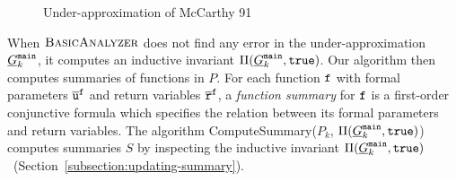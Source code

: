 \begin{figure}[htb]
{
	}  
  \caption{Under-approximation of McCarthy 91}
  \label{figure:under-mccarthy91}
\end{figure}

When $\textsc{BasicAnalyzer}$ does not find any error in the
under-approximation $\underline{G}^{\mathtt{{main}}}_k$, it computes an inductive
invariant $\Pi (\underline{G}^{\mathtt{{main}}}_k, \mathtt{true})$. Our algorithm then computes
summaries of functions in $P$. For each function $\mathtt{{f}}$ with
formal parameters $\overline{\mathtt{u}}^{\mathtt{{f}}}$ and return
variables $\overline{\mathtt{r}}^{\mathtt{{f}}}$, a \emph{function summary} for
$\mathtt{{f}}$ is a 
first-order conjunctive formula which specifies the relation between
its formal parameters and return variables. The algorithm
ComputeSummary($P_k$, $\Pi (\underline{G}^{\mathtt{{main}}}_k, \mathtt{true})$) computes summaries $S$ by inspecting
the inductive invariant $\Pi (\underline{G}^{\mathtt{{main}}}_k, \mathtt{true})$~(Section~\ref{subsection:updating-summary}). 

